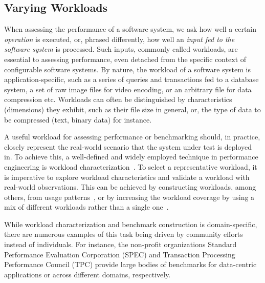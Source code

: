 {\color{black}
\subsection{Varying Workloads}\label{sec:varying_workloads}
When assessing the performance of a software system, we ask how well a certain \textit{operation} is executed, or, phrased differently, how well an \textit{input fed to the software system} is processed. Such inputs, commonly called workloads, are essential to assessing performance, even detached from the specific context of configurable software systems. By nature, the workload of a software system is application-specific, such as a series of queries and transactions fed to a database system, a set of raw image files for video encoding, or an arbitrary file for data compression etc. Workloads can often be distinguished by characteristics (dimensions) they exhibit, such as their file size in general, or, the  type of data to be compressed (text, binary data) for instance.

A useful workload for assessing performance or benchmarking should, in practice, closely represent the real-world scenario that the system under test is deployed in. To achieve this, a well-defined and widely employed technique in performance engineering is workload characterization~\cite{ceesay2020,papadopoulos2021}. To select a representative workload, it is imperative to explore workload characteristics and validate a workload with real-world observations. This can be achieved by constructing workloads, among others, from usage patterns~\cite{calzarossa2016}, or by increasing the workload coverage by using a mix of different workloads rather than a single one~\cite{jiang2015survey}.

While workload characterization and benchmark construction is domain-specific, there are numerous examples of this task being driven by community efforts instead of individuals. For instance, the non-profit organizations Standard Performance Evaluation Corporation (SPEC) and Transaction Processing Performance Council (TPC) provide large bodies of benchmarks for data-centric applications or across different domains, respectively.

}

